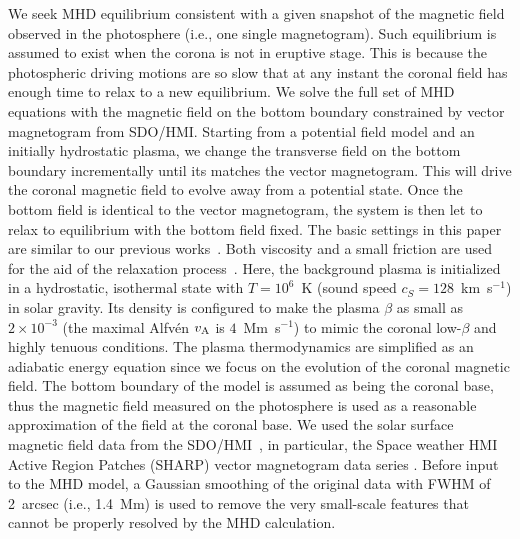 \documentclass[twocolumn]{aastex6} %
\begin{document}
\begin{CJK*}{UTF8}{gbsn}
{We seek MHD equilibrium consistent with a given snapshot of the
magnetic field observed in the photosphere (i.e., one single magnetogram)}. Such equilibrium is
assumed to exist when the corona is not in eruptive
stage. This is because the photospheric driving motions are so slow
that at any instant the coronal field has enough time to relax to a new
equilibrium. We solve the full set of MHD equations with the magnetic
field on the bottom boundary constrained by vector magnetogram from
SDO/HMI. Starting from a potential field model and an initially
hydrostatic plasma, we change the transverse field on the bottom
boundary incrementally until its matches the vector magnetogram. This
will drive the coronal magnetic field to evolve away from a potential
state. Once the bottom field is identical to the vector magnetogram,
the system is then let to relax to equilibrium with the bottom field
fixed.
The basic settings in this paper are similar
to our previous works~\citep{Jiang2012c, Jiang2013MHD,
  Jiang2016NC, Jiang2017}.
{Both viscosity and a small friction are used for the aid of the relaxation
process~\citep[see][]{Jiang2012c}}.  Here, the background plasma is initialized in a
hydrostatic, isothermal state with $T=10^{6}$~K (sound speed
$c_{S}=128$~km~s$^{-1}$) in solar gravity. Its density is configured
to make the plasma $\beta$ as small as $2\times 10^{-3}$ (the maximal
Alfv{\'e}n $v_{\rm A}$ is $4$~Mm~s$^{-1}$) to mimic the coronal
low-$\beta$ and highly tenuous conditions. The plasma thermodynamics
are simplified as an adiabatic energy equation since we focus on the
evolution of the coronal magnetic field. The bottom boundary of the
model is assumed as being the coronal base, thus the magnetic field
measured on the photosphere is used as a reasonable approximation of
the field at the coronal base. We used the solar surface magnetic
field data from the SDO/HMI~\citep{Schou2012HMI}, in particular, the
Space weather HMI Active Region Patches (SHARP) vector magnetogram
data series \citep{Hoeksema2014, Bobra2014}. Before input to the MHD
model, a Gaussian smoothing of the original data with FWHM of 2~arcsec (i.e., 1.4~Mm)
is used to remove the very small-scale features that cannot be
properly resolved by the MHD calculation.


\end{CJK*}
\end{document}
